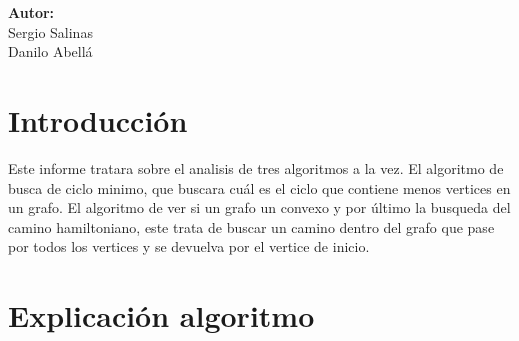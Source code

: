 \documentclass[12pt,letterpaper]{scrartcl}
\begin{document}
\begin{titlepage}
\begin{center}
\begin{minipage}[l]{0.4\textwidth}
	\begin{flushright}

		\textbf{\textsf{Autor:}}\\
		\linespread{1}
		\large Sergio Salinas\\
		\large Danilo Abellá\\

	\end{flushright}
\end{minipage}

\end{center}

\end{titlepage}



\newpage

\tableofcontents

\newpage
\section{Introducción}

Este informe tratara sobre el analisis de tres algoritmos a la vez. El algoritmo de busca de ciclo minimo, que buscara cuál es el ciclo que contiene menos vertices en un grafo. El algoritmo de ver si un grafo un convexo y por último la busqueda del camino hamiltoniano, este trata de buscar un camino dentro del grafo que pase por todos los vertices y se devuelva por el vertice de inicio.

\section{Explicación algoritmo}
\end{document}
